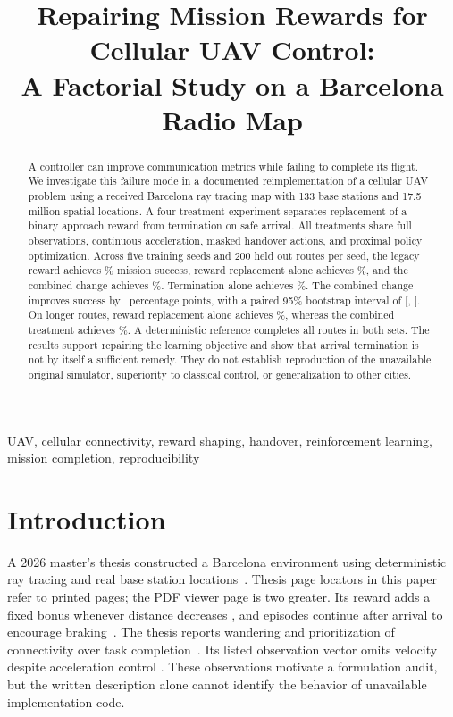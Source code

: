 \documentclass[conference]{IEEEtran}
\title{Repairing Mission Rewards for Cellular UAV Control:\\A Factorial Study on a Barcelona Radio Map}
\author{\IEEEauthorblockN{Guillem Moreno Garcia and Evgenii Vinogradov}
\IEEEauthorblockA{Universitat Polit\`ecnica de Catalunya, Barcelona, Spain\\
Research draft, 12 September 2026}}
\begin{document}
\maketitle

\begin{abstract}
A controller can improve communication metrics while failing to complete its
flight. We investigate this failure mode in a documented reimplementation of a
cellular UAV problem using a received Barcelona ray tracing map with 133 base
stations and 17.5 million spatial locations. A four treatment experiment
separates replacement of a binary approach reward from termination on safe
arrival. All treatments share full observations, continuous acceleration,
masked handover actions, and proximal policy optimization. Across five training
seeds and 200 held out routes per seed, the legacy reward achieves
\LegacySuccess\% mission success, reward replacement alone achieves
\RewardOnlySuccess\%, and the combined change achieves \FixedSuccess\%.
Termination alone achieves \TerminationSuccess\%. The combined change improves
success by \PrimaryGain\ percentage points, with a paired 95\% bootstrap
interval of [\CILower, \CIUpper]. On longer routes, reward replacement alone
achieves \RewardOnlyLongSuccess\%, whereas the combined treatment achieves
\FixedLongSuccess\%. A deterministic reference completes all routes in both
sets. The results support repairing the learning objective and show that arrival
termination is not by itself a sufficient remedy. They do not establish
reproduction of the unavailable original simulator, superiority to classical
control, or generalization to other cities.
\end{abstract}

\begin{IEEEkeywords}
UAV, cellular connectivity, reward shaping, handover, reinforcement learning,
mission completion, reproducibility
\end{IEEEkeywords}

\section{Introduction}
A 2026 master's thesis constructed a Barcelona environment using deterministic
ray tracing and real base station locations~\cite[pp.~6--7, Sec.~3.1]{thesis}.
Thesis page locators in this paper refer to printed pages; the PDF viewer page
is two greater. Its reward adds a fixed bonus whenever distance decreases
\cite[p.~12, Eqs.~(13)--(14); p.~15, Table~3]{thesis}, and episodes continue
after arrival to encourage braking~\cite[p.~12, Sec.~5.2]{thesis}.
The thesis reports wandering and prioritization of connectivity over task
completion~\cite[p.~19, Sec.~7.2; p.~21, Sec.~8]{thesis}.
Its listed observation vector omits velocity despite acceleration control
\cite[p.~12, Sec.~5.2; p.~9, Eq.~(2)]{thesis}.
These observations motivate a formulation audit, but the written description
alone cannot identify the behavior of unavailable implementation code.
\end{document}
